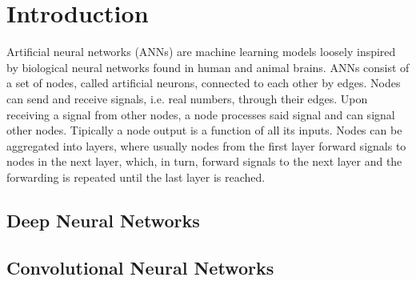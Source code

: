 \section{Introduction}
\label{sec:intro}
Artificial neural networks (ANNs) are machine learning models loosely inspired by biological neural networks found in human and animal brains. ANNs consist of a set of nodes, called artificial neurons, connected to each other by edges. Nodes can send and receive signals, i.e. real numbers, through their edges. Upon receiving a signal from other nodes, a node processes said signal and can signal other nodes. Tipically a node output is a function of all its inputs. Nodes can be aggregated into layers, where usually nodes from the first layer forward signals to nodes in the next layer, which, in turn, forward signals to the next layer and the forwarding is repeated until the last layer is reached.

\subsection{Deep Neural Networks}
\subsection{Convolutional Neural Networks}
